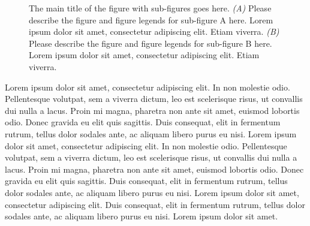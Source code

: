 \begin{figure}[tbh]
\centering
{}
\hfill
{}
\caption[The main title of the figure with sub-figures goes here, and this is is just extra text to demonstrate when the figure caption goes to multiple lines.]{The main title of the figure with sub-figures goes here. \textit{(A)} Please describe the figure and figure legends for sub-figure A here. Lorem ipsum dolor sit amet, consectetur adipiscing elit. Etiam viverra. \textit{(B)} Please describe the figure and figure legends for sub-figure B here. Lorem ipsum dolor sit amet, consectetur adipiscing elit. Etiam viverra.}
\label{fig:main_figure}
\end{figure}

Lorem ipsum dolor sit amet, consectetur adipiscing elit. In non molestie odio. Pellentesque volutpat, sem a viverra dictum, leo est scelerisque risus, ut convallis dui nulla a lacus. Proin mi magna, pharetra non ante sit amet, euismod lobortis odio. Donec gravida eu elit quis sagittis. Duis consequat, elit in fermentum rutrum, tellus dolor sodales ante, ac aliquam libero purus eu nisi. Lorem ipsum dolor sit amet, consectetur adipiscing elit. In non molestie odio. Pellentesque volutpat, sem a viverra dictum, leo est scelerisque risus, ut convallis dui nulla a lacus. Proin mi magna, pharetra non ante sit amet, euismod lobortis odio. Donec gravida eu elit quis sagittis. Duis consequat, elit in fermentum rutrum, tellus dolor sodales ante, ac aliquam libero purus eu nisi. Lorem ipsum dolor sit amet, consectetur adipiscing elit. Duis consequat, elit in fermentum rutrum, tellus dolor sodales ante, ac aliquam libero purus eu nisi. Lorem ipsum dolor sit amet. 

